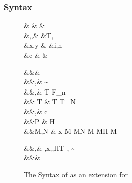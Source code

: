 \documentclass[screen,nonacm,manuscript,review]{acmart} %
\begin{document}
\subsubsection{Syntax}\label{sec:sfp-syntax}
\begin{figure}[ht]
 \centering
 \begin{syntax}
  & &  & \\
  &\TyVar,\beta,\Co &\qquad{} &T, \\
  &x,y &\qquad{} &i,n \in {} \\
  &c & &
 \end{syntax}
 \begin{syntax}
  &&\square & \\
  &&\kappa,\eta \bnfeq& \STAR \bnfor
                                  \kappa \to \kappa \bnfor \sigma\sim\tau \bnfor \shl{\chi} \bnfor {}\\
  &&\tau,\sigma \bnfeq& \TyVar \bnfor T
                                  \bnfor \tau \to \tau \bnfor
                                  \tau\App\tau \bnfor \Forall {\TyVar\co\kappa} \tau  \bnfor F_n
                                  \bnfor \shl{\Forall \chi \tau} \bnfor \shl{\tau\App\kappa} \bnfor {}\\
  && T \bnfeq& T \bnfor T_N\\
  &&\nu,\Co \bnfeq& c \bnfor {}\tau \bnfor \Sym\Co \bnfor \trans\nu\Co %
 \bnfor \Forall {\TyVar\co\kappa} \Co \bnfor \Co\At\tau %
 \bnfor \nu\App\Co \bnfor \Left \Co \bnfor \Right \Co  %
 \bnfor \shl{\Forall \chi \Co} \bnfor \shl{\Co\App\chi} %
 \bnfor \shl{\Co\At\chi}\\
  &&P \bnfeq& H \App\shl{\many\chi}\App\many{\TyVar\co\kappa} \\
  &&M,N \bnfeq& x \bnfor {} M \bnfor M\App N \bnfor \TLam{\tau\co\kappa} M \bnfor M\App \tau \bnfor H \bnfor \Case M  \bnfor \Cast \Tm \Co %
 \bnfor \shl{\TLam \chi \Tm} \bnfor \shl{\Tm\App\kappa} \\

 \end{syntax}
 \begin{syntax}
  &&\TEnv,\Delta \bnfeq& \empt \bnfor \TEnv,x\co\tau \bnfor \TEnv,\TyVar\co\kappa \bnfor \TEnv,H\co T \bnfor \TEnv, \Co \co \tau\sim\sigma\\
  &&\Subst \bnfeq& \empt \bnfor \Set{\many{\TyVar \mapsto \tau}}
 \end{syntax}
 \caption{The Syntax of \SFP as an extension for \SFC}
 \label{fig:sfp-syntax}
\end{figure}
\end{document}
